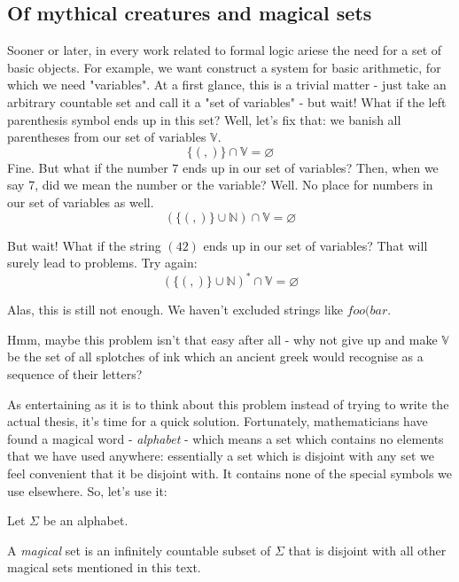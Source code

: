 \documentclass[main.tex]{subfiles}
\begin{document}
\subsection{Of mythical creatures and magical sets}

Sooner or later, in every work related to formal logic ariese the need for
a set of basic objects. For example, we want construct a system for basic
arithmetic, for which we need "variables".
At a first glance, this is a trivial matter - just take an arbitrary countable
set and call it a "set of variables" - but wait! What if the left parenthesis
symbol ends up in this set? Well, let's fix that: we banish all parentheses
from our set of variables $\mathbb{V}$.
\[ \{ (, ) \} \cap \mathbb{V} = \varnothing \]
Fine. But what if the number $7$ ends up in our set of variables? Then,
when we say 7, did we mean the number or the variable? Well. No place for
numbers in our set of variables as well.
\[ ( \{ (, ) \} \cup \mathbb{N} ) \cap \mathbb{V} = \varnothing \]

But wait! What if the string $(42)$ ends up in our set of variables? That will
surely lead to problems. Try again:
\[ ( \{ (, ) \} \cup \mathbb{N} )^* \cap \mathbb{V} = \varnothing \]

Alas, this is still not enough. We haven't excluded strings like $foo(bar$.

Hmm, maybe this problem isn't that easy after all - why not give up and make
$\mathbb{V}$ be the set of all splotches of ink which an ancient greek would
recognise as a sequence of their letters?

As entertaining as it is to think about this problem instead of trying to write
the actual thesis, it's time for a quick solution. Fortunately, mathematicians
have found a magical word - \emph{alphabet} - which means a set which contains
no elements that we have used anywhere: essentially a set which is disjoint
with any set we feel convenient that it be disjoint with. It contains none of
the special symbols we use elsewhere. So, let's use it:

Let $\Sigma$ be an alphabet.
\begin{defn}
    A \emph{magical} set is an infinitely countable subset of $\Sigma$
    that is disjoint with all other magical sets mentioned in this text.
\end{defn}
\end{document}
